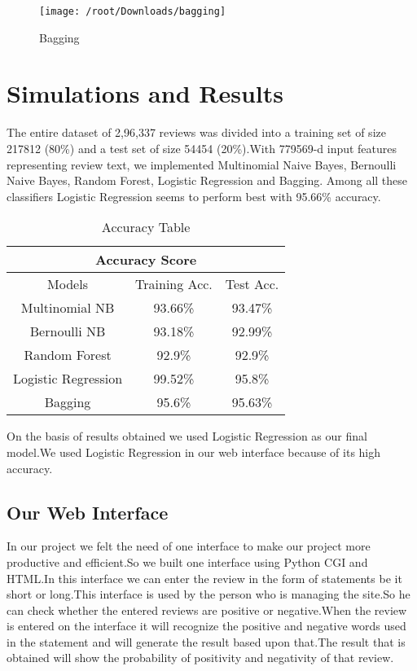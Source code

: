\documentclass[12pt,a4paper]{report}
\begin{document}
\begin{figure}[h]
	\centering
	\texttt{[image: /root/Downloads/bagging]}\\
	\caption{Bagging\cite{ref5}}
\end{figure}


\section{Simulations and Results}
\justifying

The entire dataset of 2,96,337 reviews was divided into a training  set  of  size  217812   (80\%) and a test set of size 54454 (20\%).With 779569-d input features representing review text, we implemented Multinomial Naive Bayes, Bernoulli Naive Bayes, Random Forest, Logistic Regression and Bagging. Among all these classifiers Logistic Regression seems to perform best with 95.66\% accuracy.


\begin{table}[h!]
	\begin{center}
		\caption{Accuracy Table}
		\label{tab:table1}
		\begin{tabular}{|| c c c ||} 
		\hline
		\multicolumn{3}{|c|}{Accuracy Score} \\
		\hline
		Models & Training Acc.  & Test Acc. \\ [0.5ex] 
		\hline\hline
		Multinomial NB & 93.66\% & 93.47\% \\ 
		\hline
		Bernoulli NB & 93.18\% & 92.99\%  \\
		\hline
		Random Forest & 92.9\% & 92.9\% \\
		\hline
		Logistic Regression & 99.52\% & 95.8\% \\
		\hline
		Bagging & 95.6\% & 95.63\% \\ [1ex] 
		\hline
		\end{tabular}

	\end{center}
\end{table}

On the basis of results obtained we used Logistic Regression as our final model.We used Logistic Regression in our web interface because of its high accuracy.

\newpage

\subsection{Our Web Interface}
\justifying
In our project we felt the need of one interface to make our project more productive and efficient.So we built one interface using Python CGI and HTML.In this interface we can enter the review in the form of statements be it short or long.This interface is used by the person who is managing the site.So he can check whether the entered reviews are positive or negative.When the review is entered on the interface it will recognize the positive and negative words used in the statement and will generate the result based upon that.The result that is obtained will show the probability of positivity and negativity of that review.
	
\end{document}

